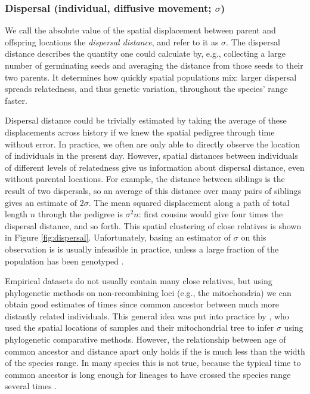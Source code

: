 \documentclass{ar-1col}
\newcommand{\g}[1]{{\color{blue}{#1}}}
\renewcommand{\emph}[1]{{\textit{#1}}}
\begin{document}
\subsubsection{Dispersal (individual, diffusive movement; $\sigma$)}

We call the absolute value of the spatial displacement between parent and offspring locations
the \emph{dispersal distance}, and refer to it as $\sigma$.
The dispersal distance describes the quantity one could calculate by,
e.g., collecting a large number of germinating seeds
and averaging the distance from those seeds to their two parents.
It determines how quickly spatial populations mix:
larger dispersal spreads relatedness, and thus genetic variation,
throughout the species' range faster.

Dispersal distance could be trivially estimated by taking
the average of these displacements across history
if we knew the spatial pedigree through time without error.
In practice, we often are only able to directly observe
the location of individuals in the present day.
However, 
spatial distances between individuals of different levels of relatedness
give us information about dispersal distance, even without parental locations.
For example,
the distance between siblings is the result of two dispersals,
so an average of this distance over many pairs of siblings 
gives an estimate of $2 \sigma$.
The mean squared displacement along
a path of total length $n$ through the pedigree is $\sigma^2 n$:
first cousins would give four times the dispersal distance, and so forth.
This spatial clustering of close relatives
is shown in Figure \ref{fig:dispersal}.
Unfortunately, basing an estimator of $\sigma$ on this observation
is is usually infeasible in practice,
unless a large fraction of the population has been genotyped
\citep[e.g.,][]{Aguillon2017deconstructing}.

Empirical datasets do not usually contain many close relatives,
but using phylogenetic methods on non-recombining loci (e.g., the mitochondria)
we can obtain good estimates of times since common ancestor
between much more distantly related individuals.
This general idea was put into practice by \citet{neigel1993application}, %
who used the spatial locations of samples and their mitochondrial tree 
to infer $\sigma$ using phylogenetic comparative methods.
However, the relationship between age of common ancestor and distance apart
only holds if the \g{predicted distance} is much less than the width of the species range.
In many species this is not true,
because the typical time to common ancestor is long enough 
for lineages to have crossed the species range several times \citet{barton1995genealogies}.
\end{document}
